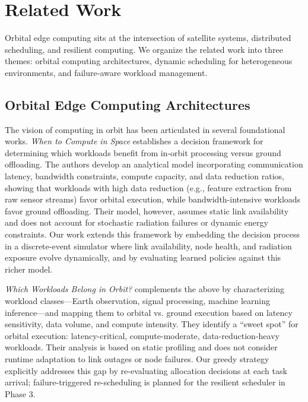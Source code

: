 \documentclass[conference]{IEEEtran}
\begin{document}
\section{Related Work}
\label{sec:related-work}

Orbital edge computing sits at the intersection of satellite systems, distributed scheduling, and resilient computing. We organize the related work into three themes: orbital computing architectures, dynamic scheduling for heterogeneous environments, and failure-aware workload management.

\subsection{Orbital Edge Computing Architectures}

The vision of computing in orbit has been articulated in several foundational works. \textit{When to Compute in Space} \cite{when-to-compute} establishes a decision framework for determining which workloads benefit from in-orbit processing versus ground offloading. The authors develop an analytical model incorporating communication latency, bandwidth constraints, compute capacity, and data reduction ratios, showing that workloads with high data reduction (e.g., feature extraction from raw sensor streams) favor orbital execution, while bandwidth-intensive workloads favor ground offloading. Their model, however, assumes static link availability and does not account for stochastic radiation failures or dynamic energy constraints. Our work extends this framework by embedding the decision process in a discrete-event simulator where link availability, node health, and radiation exposure evolve dynamically, and by evaluating learned policies against this richer model.

\textit{Which Workloads Belong in Orbit?} \cite{which-workloads} complements the above by characterizing workload classes---Earth observation, signal processing, machine learning inference---and mapping them to orbital vs. ground execution based on latency sensitivity, data volume, and compute intensity. They identify a ``sweet spot'' for orbital execution: latency-critical, compute-moderate, data-reduction-heavy workloads. Their analysis is based on static profiling and does not consider runtime adaptation to link outages or node failures. Our greedy strategy explicitly addresses this gap by re-evaluating allocation decisions at each task arrival; failure-triggered re-scheduling is planned for the resilient scheduler in Phase 3.
\end{document}
